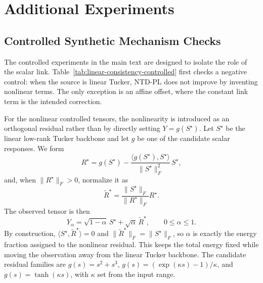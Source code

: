 \section{Additional Experiments}

\subsection{Controlled Synthetic Mechanism Checks}
\label{app:controlled-synthetic}

The controlled experiments in the main text are designed to isolate the role
of the scalar link. Table~\ref{tab:linear-consistency-controlled} first checks
a negative control: when the source is linear Tucker, NTD-PL does not improve
by inventing nonlinear terms. The only exception is an affine offset, where
the constant link term is the intended correction.

\begin{table}[ht]
  \centering
  \caption{Linear consistency on synthetic Tucker tensors. In the linear
  negative control, effective \(p>1\) contributions remain small except for
  the intended affine offset case.}
  \label{tab:linear-consistency-controlled}
  {\small
  \setlength{\tabcolsep}{4.5pt}
  \renewcommand{\arraystretch}{1.06}
  
  }
\end{table}

For the nonlinear controlled tensors, the nonlinearity is introduced as an
orthogonal residual rather than by directly setting \(Y=g(S^\star)\). Let
\(S^\star\) be the linear low-rank Tucker backbone and let \(g\) be one of the
candidate scalar responses. We form
\begin{equation}
  R^\star
  =
  g(S^\star)
  -
  \frac{\langle g(S^\star),S^\star\rangle}{\|S^\star\|_F^2}\,S^\star,
  \label{eq:controlled-orthogonal-residual}
\end{equation}
and, when \(\|R^\star\|_F>0\), normalize it as
\begin{equation}
  \widetilde R^\star
  =
  \frac{\|S^\star\|_F}{\|R^\star\|_F}R^\star .
  \label{eq:controlled-normalized-residual}
\end{equation}
The observed tensor is then
\begin{equation}
  Y_\alpha
  =
  \sqrt{1-\alpha}\,S^\star
  +
  \sqrt{\alpha}\,\widetilde R^\star,
  \qquad 0\le \alpha\le 1 .
  \label{eq:controlled-residual-mixture}
\end{equation}
By construction, \(\langle S^\star,\widetilde R^\star\rangle=0\) and
\(\|\widetilde R^\star\|_F=\|S^\star\|_F\), so \(\alpha\) is exactly the
energy fraction assigned to the nonlinear residual. This keeps the total
energy fixed while moving the observation away from the linear Tucker
backbone. The candidate residual families are \(g(s)=s^2+s^3\),
\(g(s)=(\exp(\kappa s)-1)/\kappa\), and \(g(s)=\tanh(\kappa s)\),
with \(\kappa\) set from the input range.


